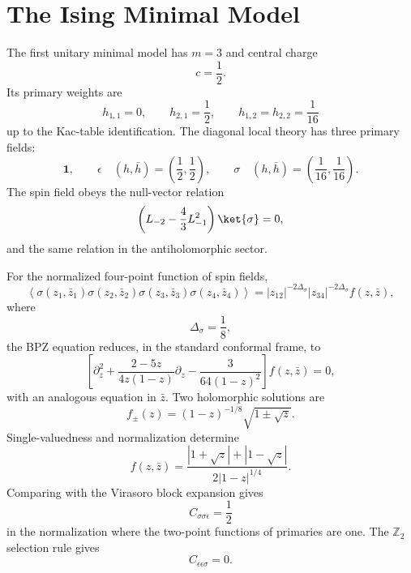 \section{The Ising Minimal Model}

The first unitary minimal model has \(m=3\) and central charge
\[
  c=\frac12.
\]
Its primary weights are
\[
  h_{1,1}=0,
  \qquad
  h_{2,1}=\frac12,
  \qquad
  h_{1,2}=h_{2,2}=\frac1{16}
\]
up to the Kac-table identification.  The diagonal local theory has three
primary fields:
\[
  \mathbf1,
  \qquad
  \epsilon\quad (h,\bar h)=\left(\frac12,\frac12\right),
  \qquad
  \sigma\quad (h,\bar h)=\left(\frac1{16},\frac1{16}\right).
\]
The spin field obeys the null-vector relation
\begin{equation}
  \left(L_{-2}-\frac43L_{-1}^2\right)\ket{\sigma}=0,
  \label{eq:ising-sigma-null}
\end{equation}
and the same relation in the antiholomorphic sector.

For the normalized four-point function of spin fields,
\[
  \left\langle
    \sigma(z_1,\bar z_1)\sigma(z_2,\bar z_2)
    \sigma(z_3,\bar z_3)\sigma(z_4,\bar z_4)
  \right\rangle
  =
  |z_{12}|^{-2\Delta_\sigma}|z_{34}|^{-2\Delta_\sigma}f(z,\bar z),
\]
where
\[
  \Delta_\sigma=\frac18,
\]
the BPZ equation reduces, in the standard conformal frame, to
\begin{equation}
  \left[
    \partial_z^2
    +
    \frac{2-5z}{4z(1-z)}\partial_z
    -
    \frac{3}{64(1-z)^2}
  \right]f(z,\bar z)=0,
  \label{eq:ising-sigma-bpz}
\end{equation}
with an analogous equation in \(\bar z\).  Two holomorphic solutions are
\[
  f_\pm(z)=(1-z)^{-1/8}\sqrt{1\pm\sqrt z}.
\]
Single-valuedness and normalization determine
\begin{equation}
  f(z,\bar z)
  =
  \frac{|1+\sqrt z|+|1-\sqrt z|}
       {2|1-z|^{1/4}}.
  \label{eq:ising-spin-four-point}
\end{equation}
Comparing with the Virasoro block expansion gives
\[
  C_{\sigma\sigma\epsilon}=\frac12
\]
in the normalization where the two-point functions of primaries are one.  The
\(\mathbb Z_2\) selection rule gives
\[
  C_{\epsilon\epsilon\sigma}=0.
\]
